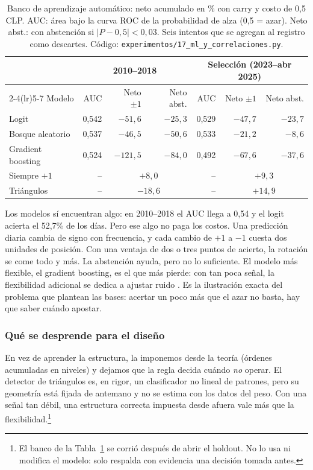 \documentclass[10pt,a4paper]{article}
\newcommand{\ruta}[1]{\nolinkurl{#1}}
\begin{document}
\begin{table}[htb]\centering\small
\begin{tabular}{@{}lrrrrrr@{}}
\toprule
& \multicolumn{3}{c}{2010--2018} & \multicolumn{3}{c}{Selección (2023--abr 2025)} \\
\cmidrule(lr){2-4}\cmidrule(lr){5-7}
Modelo & AUC & Neto $\pm1$ & Neto abst. & AUC & Neto $\pm1$ & Neto abst. \\
\midrule
Logit             & 0,542 & $-51{,}6$ & $-25{,}3$ & 0,529 & $-47{,}7$ & $-23{,}7$ \\
Bosque aleatorio  & 0,537 & $-46{,}5$ & $-50{,}6$ & 0,533 & $-21{,}2$ & $-8{,}6$ \\
Gradient boosting & 0,524 & $-121{,}5$ & $-84{,}0$ & 0,492 & $-67{,}6$ & $-37{,}6$ \\
\midrule
Siempre $+1$      & --    & \multicolumn{2}{c}{$+8{,}0$}  & --    & \multicolumn{2}{c}{$+9{,}3$} \\
Triángulos        & --    & \multicolumn{2}{c}{$-18{,}6$} & --    & \multicolumn{2}{c}{$+14{,}9$} \\
\bottomrule
\end{tabular}
\caption{Banco de aprendizaje automático: neto acumulado en \% con carry y costo de 0,5
CLP. AUC: área bajo la curva ROC de la probabilidad de alza (0,5 = azar). Neto abst.:
con abstención si $|P-0{,}5|<0{,}03$. Seis intentos que se agregan al registro como
descartes. Código: \ruta{experimentos/17_ml_y_correlaciones.py}.}\label{tab:ml}
\end{table}

Los modelos sí encuentran algo: en 2010--2018 el AUC llega a 0,54 y el logit acierta
el 52,7\% de los días. Pero ese algo no paga los costos. Una predicción diaria cambia de
signo con frecuencia, y cada cambio de $+1$ a $-1$ cuesta dos unidades de posición. Con
una ventaja de dos o tres puntos de acierto, la rotación se come todo y más. La
abstención ayuda, pero no lo suficiente. El modelo más flexible, el gradient boosting,
es el que más pierde: con tan poca señal, la flexibilidad adicional se dedica a ajustar
ruido \citep{islr2021}. Es la ilustración exacta del problema que plantean las bases:
acertar un poco más que el azar no basta, hay que saber cuándo apostar.

\subsubsection{Qué se desprende para el diseño}

En vez de aprender la estructura, la imponemos desde la teoría (órdenes acumuladas en
niveles) y dejamos que la regla decida cuándo \emph{no} operar. El detector de
triángulos es, en rigor, un clasificador no lineal de patrones, pero su geometría está
fijada de antemano y no se estima con los datos del peso. Con una señal tan débil, una
estructura correcta impuesta desde afuera vale más que la flexibilidad.\footnote{El
banco de la Tabla~\ref{tab:ml} se corrió después de abrir el holdout. No lo usa ni
modifica el modelo: solo respalda con evidencia una decisión tomada antes.}
\end{document}

